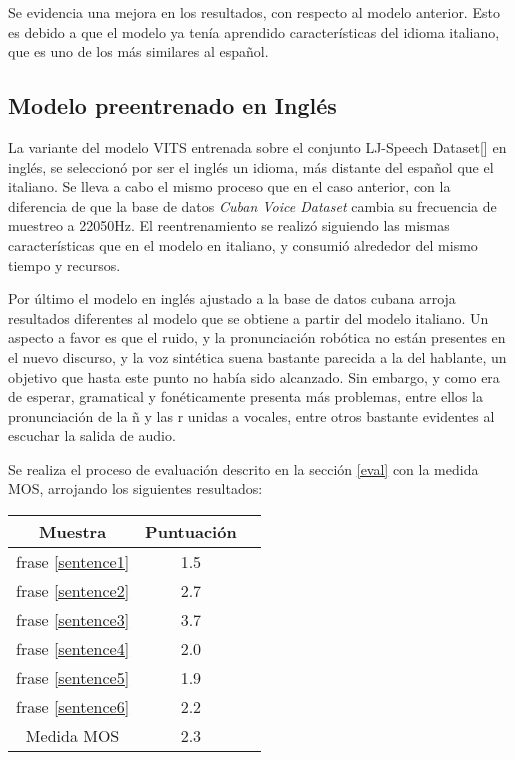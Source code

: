 Se evidencia una mejora en los resultados, con respecto al modelo anterior. Esto es debido a que el modelo ya tenía aprendido características del idioma italiano, que es uno de los más similares al español.


\subsection{Modelo preentrenado en Inglés} 
La variante del modelo VITS entrenada sobre el conjunto LJ-Speech Dataset[\cite{ljspeech}] en inglés, se seleccionó por ser el inglés un idioma, más distante del español que el italiano. Se lleva a cabo el mismo proceso que en el caso anterior, con la diferencia de que la base de datos \textit{Cuban Voice Dataset} cambia su frecuencia de muestreo a 22050Hz. 
El reentrenamiento se realizó siguiendo las mismas características que en el modelo en italiano, y consumió alrededor del mismo tiempo y recursos.

Por último el modelo en inglés ajustado a la base de datos cubana arroja resultados diferentes al modelo que se obtiene a partir del modelo italiano. Un aspecto a favor es que el ruido, y la pronunciación robótica no están presentes en el nuevo discurso, y la voz sintética suena bastante parecida a la del hablante, un objetivo que hasta este punto no había sido alcanzado. Sin embargo, y como era de esperar, gramatical y fonéticamente presenta más problemas, entre ellos la pronunciación de la ñ y las r unidas a vocales, entre otros bastante evidentes al escuchar la salida de audio.

Se realiza el proceso de evaluación descrito en la sección \ref{eval} con la medida MOS, arrojando los siguientes resultados:

\begin{center} \begin{tabular}{ |c|c|c| } 
		\hline 
		Muestra & Puntuación \\
		\hline
		frase \ref{sentence1} & 1.5 \\
		frase \ref{sentence2} & 2.7 \\
		frase \ref{sentence3} & 3.7 \\
		frase \ref{sentence4} & 2.0 \\
		frase \ref{sentence5} & 1.9 \\
		frase \ref{sentence6} & 2.2 \\
		\hline
		Medida MOS & 2.3\\
		\hline 
	\end{tabular} 
\end{center}


